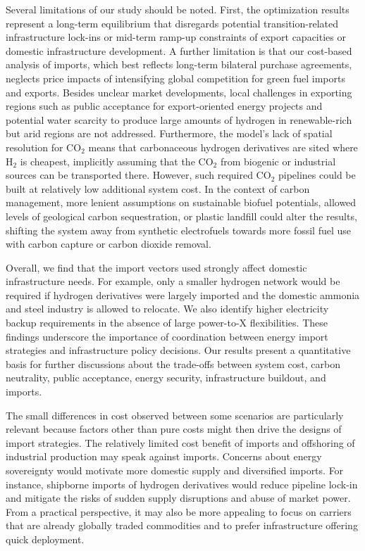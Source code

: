 Several limitations of our study should be noted. First, the optimization
results represent a long-term equilibrium that disregards potential
transition-related infrastructure lock-ins or mid-term ramp-up constraints of
export capacities or domestic infrastructure development. A further limitation
is that our cost-based analysis of imports, which best reflects long-term
bilateral purchase agreements, neglects price impacts of intensifying global
competition for green fuel imports and exports.\cite{galimovaGlobalTrading2023a}
Besides unclear market developments, local challenges in exporting regions such
as public acceptance for export-oriented energy
projects\cite{ishmamMappingLocalGreen2024} and potential water
scarcity\cite{franzmannGreenHydrogenCostpotentials2023,terlouwFutureHydrogenEconomies2024}
to produce large amounts of hydrogen in renewable-rich but arid regions are not
addressed. Furthermore, the model's lack of spatial resolution for CO$_2$ means
that carbonaceous hydrogen derivatives are sited where H$_2$ is cheapest,
implicitly assuming that the CO$_2$ from biogenic or industrial sources can be
transported there. However, such required CO$_2$ pipelines could be built at
relatively low additional system cost.\cite{hofmannH2CO2Network2024} In the
context of carbon management, more lenient assumptions on sustainable biofuel
potentials, allowed levels of geological carbon sequestration, or plastic
landfill could alter the results, shifting the system away from synthetic
electrofuels towards more fossil fuel use with carbon capture or carbon dioxide
removal.\cite{hofmannH2CO2Network2024,millingerDiversityBiomassUsage2023}


Overall, we find that the import vectors used strongly affect domestic
infrastructure needs. For example, only a smaller hydrogen network would be
required if hydrogen derivatives were largely imported and the domestic ammonia
and steel industry is allowed to relocate. We also identify higher electricity
backup requirements in the absence of large power-to-X flexibilities. These
findings underscore the importance of coordination between energy import
strategies and infrastructure policy decisions. Our results present a
quantitative basis for further discussions about the trade-offs between system
cost, carbon neutrality, public acceptance, energy security, infrastructure
buildout, and imports.

The small differences in cost observed between some scenarios are particularly
relevant because factors other than pure costs might then drive the designs of
import strategies. The relatively limited cost benefit of imports and offshoring
of industrial production may speak against imports. Concerns about energy
sovereignty would motivate more domestic supply and diversified imports. For
instance, shipborne imports of hydrogen derivatives would reduce pipeline
lock-in and mitigate the risks of sudden supply disruptions and abuse of market
power. From a practical perspective, it may also be more appealing to focus on
carriers that are already globally traded commodities and to prefer
infrastructure offering quick deployment.

